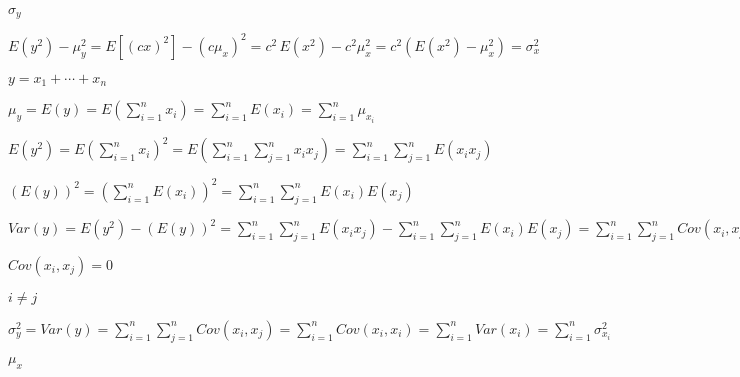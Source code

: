 \documentclass{article}
\def\lthtmlcheckvsize{\ifdim\ht\sizebox<\vsize 
  \ifdim\wd\sizebox<\hsize\expandafter\hfill\fi \expandafter\vfill
  \else\expandafter\vss\fi}%
\begin{document}
{\newpage\clearpage
{}%
$\displaystyle \sigma_y$%
\lthtmlindisplaymathZ
\lthtmlcheckvsize\clearpage}

{\newpage\clearpage
{}%
$\displaystyle E(y^2)-\mu_y^2=E[(cx)^2]-(c\mu_x)^2=c^2\,E(x^2)-c^2 \mu_x^2
=c^2 (E(x^2)-\mu_x^2)=\sigma_x^2$%
\lthtmlindisplaymathZ
\lthtmlcheckvsize\clearpage}

{\newpage\clearpage
{}%
$ y=x_1+\cdots+x_n$%
\lthtmlindisplaymathZ
\lthtmlcheckvsize\clearpage}

{\newpage\clearpage
{}%
$\displaystyle \mu_y=E(y)=E\left( \sum_{i=1}^n x_i \right)=\sum_{i=1}^n E(x_i)=\sum_{i=1}^n \mu_{x_i}$%
\lthtmlindisplaymathZ
\lthtmlcheckvsize\clearpage}

{\newpage\clearpage
{}%
$\displaystyle E(y^2)=E\left( \sum_{i=1}^n x_i \right)^2
=E\left( \sum_{i=1}^n\sum_{j=1}^n x_ix_j \right)
=\sum_{i=1}^n\sum_{j=1}^n E(x_ix_j)$%
\lthtmlindisplaymathZ
\lthtmlcheckvsize\clearpage}

{\newpage\clearpage
{}%
$\displaystyle (E(y))^2=\left( \sum_{i=1}^n E(x_i) \right)^2=\sum_{i=1}^n\sum_{j=1}^n E(x_i)E(x_j)$%
\lthtmlindisplaymathZ
\lthtmlcheckvsize\clearpage}

{\newpage\clearpage
{}%
$\displaystyle Var(y)=E(y^2)-(E(y))^2=\sum_{i=1}^n\sum_{j=1}^n E(x_ix_j)-\sum_{i=1}^n\sum_{j=1}^n E(x_i)E(x_j)
=\sum_{i=1}^n\sum_{j=1}^n Cov(x_i,x_j)$%
\lthtmlindisplaymathZ
\lthtmlcheckvsize\clearpage}

{\newpage\clearpage
{}%
$ Cov(x_i,x_j)=0$%
\lthtmlindisplaymathZ
\lthtmlcheckvsize\clearpage}

{\newpage\clearpage
{}%
$ i\ne j$%
\lthtmlindisplaymathZ
\lthtmlcheckvsize\clearpage}

{\newpage\clearpage
{}%
$\displaystyle \sigma_y^2=Var(y)=\sum_{i=1}^n \sum_{j=1}^n Cov(x_i,x_j)=\sum_{i=1}^n Cov(x_i,x_i)
=\sum_{i=1}^n Var(x_i)=\sum_{i=1}^n \sigma_{x_i}^2$%
\lthtmlindisplaymathZ
\lthtmlcheckvsize\clearpage}

{\newpage\clearpage
{}%
$ \mu_x$%
\lthtmlindisplaymathZ
\lthtmlcheckvsize\clearpage}
\end{document}
